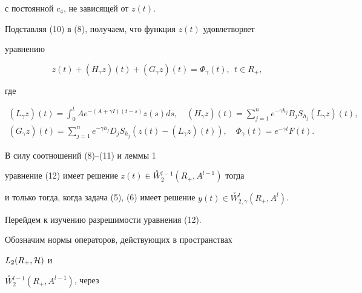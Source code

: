 с постоянной $c_4$, не зависящей от $z(t)$.


Подставляя (10) в (8), получаем, что функция $z(t)$ удовлетворяет


уравнению


\begin{equation}


z(t)+(H_{\gamma }z)(t)+(G_{\gamma }z)(t)=\Phi_{\gamma }(t),\ \ t\in


R_{+},


\end{equation}


где


\begin{gather*}


(L_{\gamma }z)(t)=\int_0^tAe^{-(A+\gamma


I)(t-s)}z(s)ds,\quad (H_{\gamma }z)(t)=\sum\limits_{j=1}^n


e^{-\gamma h_j}B_jS_{h_j}(L_{\gamma }z)(t), \\


%


(G_{\gamma }z)(t)=\sum\limits_{j=1}^n e^{-\gamma


h_j}D_jS_{h_j}(z(t)- (L_{\gamma }z)(t)),\quad \Phi_{\gamma


}(t)=e^{-\gamma t}F(t).


\end{gather*}





\begin{note}


В силу соотношений (8)--(11) и леммы 1


уравнение (12) имеет решение $z(t)\in


\overset{\circ}{W}{} ^{l-1}_2(R_+,A^{l-1})$ тогда


и только тогда, когда задача (5), (6) имеет решение $y(t) \in


\overset{\circ}{W}{} ^l_{2,\gamma }(R_+,A^l)$.


\end{note}





Перейдем к изучению разрешимости уравнения (12).





Обозначим нормы операторов, действующих в пространствах


$L_2(R_+,{\cal H})$ и


$\overset{\circ}{W}{}^{l-1}_2(R_+,A^{l-1})$, через



